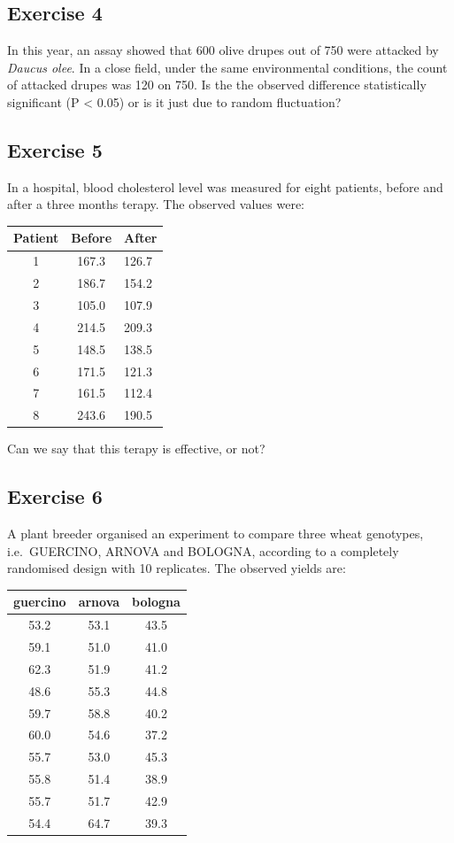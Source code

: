 \documentclass[a4paper,12pt,oneside]{book}
\begin{document}
\hypertarget{exercise-4-2}{%
\subsection{Exercise 4}\label{exercise-4-2}}

In this year, an assay showed that 600 olive drupes out of 750 were attacked by \emph{Daucus olee}. In a close field, under the same environmental conditions, the count of attacked drupes was 120 on 750. Is the the observed difference statistically significant (P \textless{} 0.05) or is it just due to random fluctuation?

\hypertarget{exercise-5-1}{%
\subsection{Exercise 5}\label{exercise-5-1}}

In a hospital, blood cholesterol level was measured for eight patients, before and after a three months terapy. The observed values were:

\begin{longtable}[]{@{}ccl@{}}
\toprule
Patient & Before & After \\
\midrule
\endhead
1 & 167.3 & 126.7 \\
2 & 186.7 & 154.2 \\
3 & 105.0 & 107.9 \\
4 & 214.5 & 209.3 \\
5 & 148.5 & 138.5 \\
6 & 171.5 & 121.3 \\
7 & 161.5 & 112.4 \\
8 & 243.6 & 190.5 \\
\bottomrule
\end{longtable}

Can we say that this terapy is effective, or not?

\hypertarget{exercise-6}{%
\subsection{Exercise 6}\label{exercise-6}}

A plant breeder organised an experiment to compare three wheat genotypes, i.e.~GUERCINO, ARNOVA and BOLOGNA, according to a completely randomised design with 10 replicates. The observed yields are:

\begin{tabular}{c|c|c}
\hline
guercino & arnova & bologna\\
\hline
53.2 & 53.1 & 43.5\\
\hline
59.1 & 51.0 & 41.0\\
\hline
62.3 & 51.9 & 41.2\\
\hline
48.6 & 55.3 & 44.8\\
\hline
59.7 & 58.8 & 40.2\\
\hline
60.0 & 54.6 & 37.2\\
\hline
55.7 & 53.0 & 45.3\\
\hline
55.8 & 51.4 & 38.9\\
\hline
55.7 & 51.7 & 42.9\\
\hline
54.4 & 64.7 & 39.3\\
\hline
\end{tabular}
\end{document}
